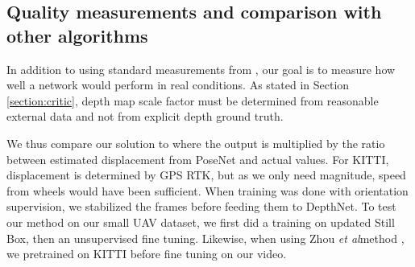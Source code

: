 \documentclass[runningheads]{llncs}
\def\etal{\emph{et al}\:}
\begin{document}
\subsection{Quality measurements and comparison with other algorithms}
In addition to
using
standard measurements from \cite{eigen2014depth}, our goal is to measure how well a network would perform in real conditions. As stated in Section \ref{section:critic}, depth map scale factor must be determined from reasonable external data and not from explicit depth ground truth.

We thus compare our solution to \cite{zhou2017unsupervised} where the output is multiplied by the ratio between estimated displacement from PoseNet and actual values. For KITTI, displacement is determined by GPS RTK, but as we only need magnitude, speed from wheels would have been sufficient. When training was done with orientation supervision, we stabilized the frames before feeding them to DepthNet.
To test our method on our small UAV dataset, we first did a training on updated Still Box, then an unsupervised fine tuning. Likewise, when using Zhou \etal method \cite{zhou2017unsupervised}, we pretrained on KITTI before fine tuning on our video.
\end{document}
